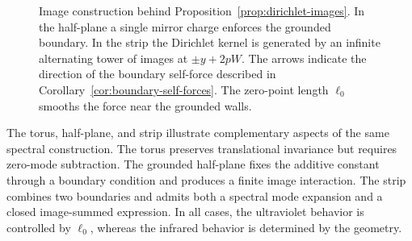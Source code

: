 \documentclass[openacc]{rsproca_new}%
\begin{document}
\begin{figure}[t]
\centering
{}
\caption{Image construction behind Proposition~\ref{prop:dirichlet-images}. In the half-plane a single mirror charge enforces the grounded boundary. In the strip the Dirichlet kernel is generated by an infinite alternating tower of images at \(\pm y+2pW\). The arrows indicate the direction of the boundary self-force described in Corollary~\ref{cor:boundary-self-forces}. The zero-point length \(\ell_0\) smooths the force near the grounded walls.}
\label{fig:dirichlet-images}
\end{figure}
The torus, half-plane, and strip illustrate complementary aspects of the same spectral construction. The torus preserves translational invariance but requires zero-mode subtraction. The grounded half-plane fixes the additive constant through a boundary condition and produces a finite image interaction. The strip combines two boundaries and admits both a spectral mode expansion and a closed image-summed expression. In all cases, the ultraviolet behavior is controlled by \(\ell_0\), whereas the infrared behavior is determined by the geometry.
\end{document}
